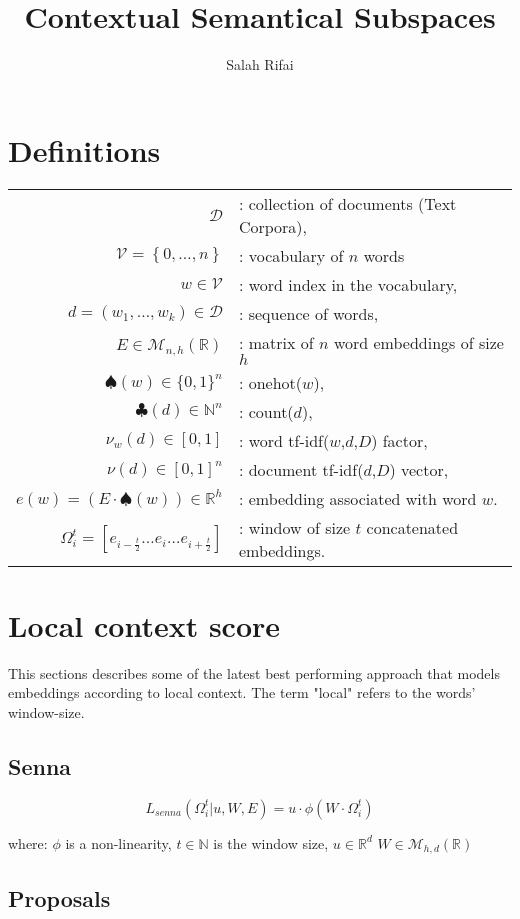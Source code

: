 \documentclass[11pt]{article} %
\title{Contextual Semantical Subspaces}
\author{Salah Rifai}
\begin{document}
\maketitle
\section{Definitions}
\begin{tabular}{r l}
 $\mathcal{D}$ &:  collection of documents (Text Corpora), \\
$\mathcal{V} = \left\{0,\ldots,n\right\}$ &: vocabulary of $n$ words \\
 $w \in \mathcal{V}$ &: word index in the vocabulary,\\
 $d = (w_1,\ldots,w_k) \in \mathcal{D}$ &: sequence of words, \\
$E \in \mathcal{M}_{n,h}(\mathbb{R})$&: matrix of $n$ word embeddings of size $h$\\
$\spadesuit(w) \in \{0,1\}^n$&: onehot($w$), \\
$\clubsuit(d) \in \mathbb{N}^n$&: count($d$), \\
$ \nu_w (d) \in \left[0,1\right]$ &: word tf-idf($w$,$d$,$D$) factor, \\
$\nu(d) \in  \left[0,1\right]^n$&: document tf-idf($d$,$D$) vector, \\
$ e(w)=\left(E\cdot\spadesuit\left(w\right)\right)  \in \mathbb{R}^h$&: embedding associated with word $w$.\\
$\Omega_i^t =  \left[e_{i-\frac{t}{2}} \ldots e_{i}  \ldots e_{i+\frac{t}{2}} \right]$ & : window  of size $t$ concatenated embeddings.
\end{tabular} 

\section{Local context score}
This sections describes some of the latest best performing approach that models embeddings according to local context. The term "local" refers to the words' window-size.
\subsection{Senna}

\[ L_{senna} \left(\Omega_i^t | u,W,E\right) = u \cdot \phi \left( W \cdot \Omega_i^t \right)  \]

where:
$\phi$ is a non-linearity, $t \in \mathbb{N}$ is the window size, $u \in \mathbb{R}^d$  $W \in \mathcal{M}_{h,d}(\mathbb{R})$
\subsection{Proposals}
\end{document}
